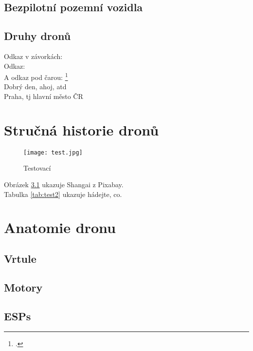 \documentclass[12pt]{report}
\begin{document}
\section{Bezpilotní pozemní vozidla}







\section{Druhy dronů}
	Odkaz v závorkách: \parencite[see][page 900]{einstein}\\
	Odkaz: \cite{knuthwebsite}\\
	A odkaz pod čarou: \footcite[see][s. 42]{latexcompanion}\\
	Dobrý den, ahoj, \gls{atd}\\
	Praha, \gls{tj} hlavní město ČR
	



\chapter[Stručná historie dronů]{Stručná historie dronů}
\begin{figure}
  \texttt{[image: test.jpg]}
  \caption{Testovací}
  \label{fig:test}
\end{figure}
Obrázek \ref{fig:test} ukazuje Shangai z Pixabay.\\
Tabulka \ref{tab:test2} ukazuje hádejte, co.
	
\lipsum[3]

\chapter{Anatomie dronu}

\section{Vrtule}
\lipsum[1]

\section{Motory}

\lipsum[1]

\section{ESPs}
\end{document}

